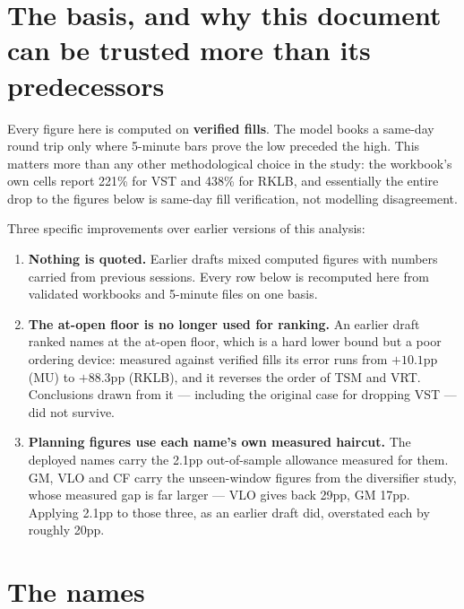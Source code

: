 \documentclass[11pt]{article}
\newcommand{\pc}[1]{#1\%}
\begin{document}
\section{The basis, and why this document can be trusted more than its predecessors}

Every figure here is computed on \textbf{verified fills}. The model books a same-day round trip
only where 5-minute bars prove the low preceded the high. This matters more than any other
methodological choice in the study: the workbook's own cells report \pc{221} for VST and
\pc{438} for RKLB, and essentially the entire drop to the figures below is same-day fill
verification, not modelling disagreement.

Three specific improvements over earlier versions of this analysis:

\begin{enumerate}[leftmargin=1.4em,itemsep=3pt]
  \item \textbf{Nothing is quoted.} Earlier drafts mixed computed figures with numbers carried
        from previous sessions. Every row below is recomputed here from validated workbooks and
        5-minute files on one basis.
  \item \textbf{The at-open floor is no longer used for ranking.} An earlier draft ranked names
        at the at-open floor, which is a hard lower bound but a poor ordering device: measured
        against verified fills its error runs from $+10.1$pp (MU) to $+88.3$pp (RKLB), and it
        reverses the order of TSM and VRT. Conclusions drawn from it --- including the original
        case for dropping VST --- did not survive.
  \item \textbf{Planning figures use each name's own measured haircut.} The deployed names carry
        the 2.1pp out-of-sample allowance measured for them. GM, VLO and CF carry the
        unseen-window figures from the diversifier study, whose measured gap is far larger ---
        VLO gives back 29pp, GM 17pp. Applying 2.1pp to those three, as an earlier draft did,
        overstated each by roughly 20pp.
\end{enumerate}

\section{The names}
\end{document}
